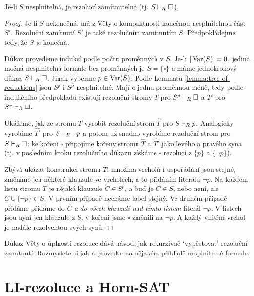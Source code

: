 \begin{theorem}
Je-li $S$ nesplnitelná, je rezolucí zamítnutelná (tj. $S\vdash_R\square$).
\end{theorem}   
\begin{proof}
Je-li $S$ nekonečná, má z Věty o kompaktnosti konečnou nesplnitelnou část $S'$. Rezoluční zamítnutí $S'$ je také rezolučním zamítnutím $S$. Předpokládejme tedy, že $S$ je konečná. 

Důkaz provedeme indukcí podle počtu proměnných v $S$. Je-li $|\operatorname{Var}(S)|=0$, jediná možná nesplnitelná formule bez proměnných je $S=\{\square\}$ a máme jednokrokový důkaz $S\vdash_R\square$. Jinak vyberme $p\in\operatorname{Var}(S)$. Podle Lemmatu \ref{lemma:tree-of-reductions} jsou $S^p$ i $S^{\bar p}$ nesplnitelné. Mají o jednu proměnnou méně, tedy podle indukčního předpokladu existují rezoluční stromy $T$ pro $S^p\vdash_R\square$ a $T'$ pro $S^{\bar p}\vdash_R\square$.

Ukážeme, jak ze stromu $T$ vyrobit rezoluční strom $\widehat T$ pro $S\vdash_R p$. Analogicky vyrobíme $\widehat{T'}$ pro $S\vdash_R\neg p$ a potom už snadno vyrobíme rezoluční strom pro $S\vdash_R\square$: ke kořeni $\square$ připojíme kořeny stromů $\widehat T$ a $\widehat{T'}$ jako levého a pravého syna (tj. v posledním kroku rezolučního důkazu získáme $\square$ rezolucí z $\{p\}$ a $\{\neg p\}$).

Zbývá ukázat konstrukci stromu $\widehat T$: množina vrcholů i uspořádání jsou stejné, změníme jen některé klauzule ve vrcholech, a to přidáním literálu $\neg p$. Na každém listu stromu $T$ je nějaká klauzule $C\in S^p$, a buď je $C\in S$, nebo není, ale $C\cup\{\neg p\}\in S$. V prvním případě necháme label stejný. Ve druhém případě přidáme přidáme do $C$ \emph{a do všech klauzulí nad tímto listem} literál $\neg p$. V listech jsou nyní jen klauzule z $S$, v kořeni jsme $\square$ změnili na $\neg p$. A každý vnitřní vrchol je nadále rezolventou svých synů.
\end{proof}

\begin{exercise}
    Důkaz Věty o úplnosti rezoluce dává návod, jak rekurzivně `vypěstovat' rezoluční zamítnutí. Rozmyslete si jak a proveďte na nějakém příkladě nesplnitelné formule.
\end{exercise} %

\section{LI-rezoluce a Horn-SAT}


